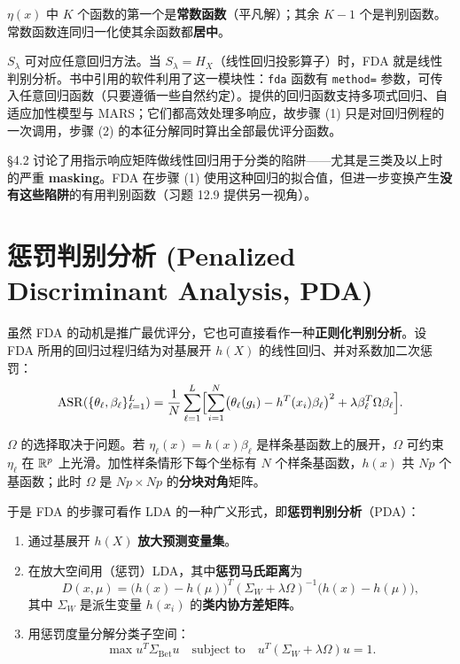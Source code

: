 $\eta(x)$ 中 $K$ 个函数的第一个是\textbf{常数函数}（平凡解）；其余 $K-1$ 个是判别函数。常数函数连同归一化使其余函数都\textbf{居中}。

\begin{remark}
$S_\lambda$ 可对应任意回归方法。当 $S_\lambda = H_X$（线性回归投影算子）时，FDA 就是线性判别分析。书中引用的软件利用了这一模块性：\texttt{fda} 函数有 \texttt{method=} 参数，可传入任意回归函数（只要遵循一些自然约定）。提供的回归函数支持多项式回归、自适应加性模型与 MARS；它们都高效处理多响应，故步骤 (1) 只是对回归例程的一次调用，步骤 (2) 的本征分解同时算出全部最优评分函数。

§4.2 讨论了用指示响应矩阵做线性回归用于分类的陷阱——尤其是三类及以上时的严重 \textbf{masking}。FDA 在步骤 (1) 使用这种回归的拟合值，但进一步变换产生\textbf{没有这些陷阱}的有用判别函数（习题 12.9 提供另一视角）。
\end{remark}

\section{惩罚判别分析 (Penalized Discriminant Analysis, PDA)}

虽然 FDA 的动机是推广最优评分，它也可直接看作一种\textbf{正则化判别分析}。设 FDA 所用的回归过程归结为对基展开 $h(X)$ 的线性回归、并对系数加二次惩罚：
\begin{equation}
\mathrm{ASR}(\{\theta_\ell,\beta_\ell\}_{\ell=1}^{L}) = \frac{1}{N}\sum_{\ell=1}^{L}\Bigl[\sum_{i=1}^{N}\bigl(\theta_\ell(g_i) - h^T(x_i)\beta_\ell\bigr)^2 + \lambda \beta_\ell^T \Omega \beta_\ell\Bigr]. \label{eq:12_57}
\end{equation}

\begin{remark}
$\Omega$ 的选择取决于问题。若 $\eta_\ell(x)=h(x)\beta_\ell$ 是样条基函数上的展开，$\Omega$ 可约束 $\eta_\ell$ 在 $\mathbb{R}^p$ 上光滑。加性样条情形下每个坐标有 $N$ 个样条基函数，$h(x)$ 共 $Np$ 个基函数；此时 $\Omega$ 是 $Np\times Np$ 的\textbf{分块对角}矩阵。
\end{remark}

于是 FDA 的步骤可看作 LDA 的一种广义形式，即\textbf{惩罚判别分析}（PDA）：

\begin{enumerate}
\item 通过基展开 $h(X)$ \textbf{放大预测变量集}。
\item 在放大空间用（惩罚）LDA，其中\textbf{惩罚马氏距离}为
\begin{equation}
D(x,\mu) = \bigl(h(x) - h(\mu)\bigr)^T (\Sigma_W + \lambda\Omega)^{-1} \bigl(h(x) - h(\mu)\bigr), \label{eq:12_58}
\end{equation}
其中 $\Sigma_W$ 是派生变量 $h(x_i)$ 的\textbf{类内协方差矩阵}。
\item 用惩罚度量分解分类子空间：
\[
\max u^T \Sigma_{\mathrm{Bet}} u \quad \text{subject to}\quad u^T(\Sigma_W + \lambda\Omega)u = 1.
\]
\end{enumerate}

